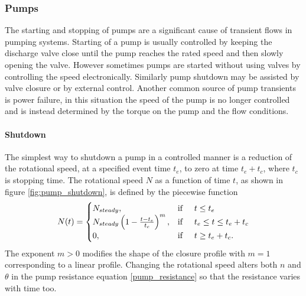 \subsubsection{Pumps}

The starting and stopping of pumps are a significant cause of transient flows in pumping systems. Starting of a pump is usually controlled by keeping the discharge valve close until the pump reaches the rated speed and then slowly opening the valve. However sometimes pumps are started without using valves by controlling the speed electronically. Similarly pump shutdown may be assisted by valve closure or by external control. Another common source of pump transients is power failure, in this situation the speed of the pump is no longer controlled and is instead determined by the torque on the pump and the flow conditions.  

\paragraph{Shutdown}

The simplest way to shutdown a pump in a controlled manner is a reduction of the rotational speed, at a specified event time $t_e$, to zero at time $t_e + t_c$, where $t_c$ is stopping time. The rotational speed $N$ as a function of time $t$, as shown in figure \ref{fig:pump_shutdown}, is defined by the piecewise function
\begin{align}\label{pump_shutdown_function}
N(t) = 
\begin{cases} 
N_{steady}, &\text{if} \hspace{0.5cm} t \leq t_e \\
N_{steady} \left( 1 - \frac{t-t_e}{t_c} \right)^m, &\text{if} \hspace{0.5cm} t_e \leq t \leq t_e + t_c \\
0, &\text{if} \hspace{0.5cm} t \geq t_e + t_c. 
\end{cases}
\end{align}
The exponent $m > 0$ modifies the shape of the closure profile with $m=1$ corresponding to a linear profile. Changing the rotational speed alters both $n$ and $\theta$ in the pump resistance equation \eqref{pump_resistance} so that the resistance varies with time too. 

